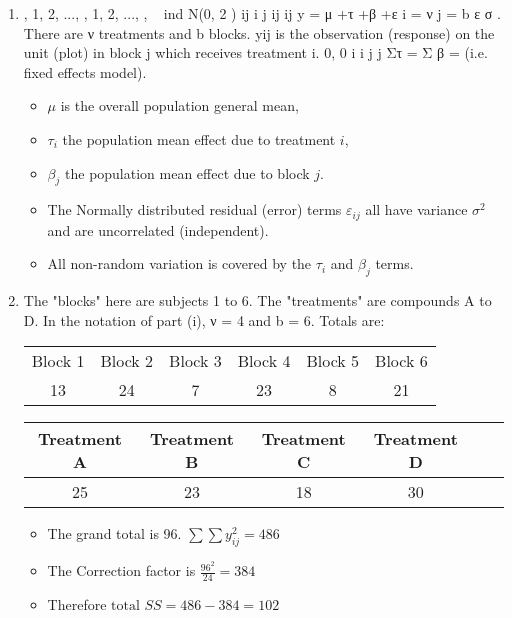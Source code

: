 \documentclass[a4paper,12pt]{article}
\begin{document}
\begin{enumerate}
\item , 1, 2, ..., , 1, 2, ..., , { } ~ ind N(0, 2 ) ij i j ij ij y = μ +τ +β +ε i = ν j = b ε σ .
There are ν treatments and b blocks. yij is the observation (response) on the unit (plot)
in block j which receives treatment i. 0, 0 i i j j Στ = Σ β = (i.e. fixed effects model).
\begin{itemize}
    \item $\mu$ is the overall population general mean, 
        \item $\tau_i$ the population mean effect due to
treatment $i$,    \item $\beta_j$ the population mean effect due to block $j$. 
    \item The Normally distributed
residual (error) terms $\varepsilon_{ij}$ all have variance $\sigma^2$ and are uncorrelated (independent).    \item All
non-random variation is covered by the $\tau_i$
 and $\beta_j$ terms.
\end{itemize}

\item The "blocks" here are subjects 1 to 6. The "treatments" are compounds A to
D. In the notation of part (i), ν = 4 and b = 6.
Totals are: 
\begin{center}
\begin{tabular}{|c|c|c|c|c|c|}
Block 1 & Block 2 & Block 3 & Block 4 & Block 5 & Block 6 \\
13  & 24 & 7 & 23 & 8 & 21 \\ \hline
\end{tabular}
\end{center}
\begin{center}
\begin{tabular}{|c|c|c|c|c|c|}
Treatment A & Treatment B & Treatment C & Treatment D \\ \hline
25 & 23 & 18 & 30 \\ \hline
\end{tabular}
\end{center}
\begin{itemize}
\item The grand total is 96. $\sum \sum y_{ij}^2 =486$

\item The Correction factor is $ \frac{96^2}{24} = 384 $

\item Therefore $ \mbox{total }SS = 486 - 384 = 102$


\end{itemize}
\end{enumerate}
\end{document}
